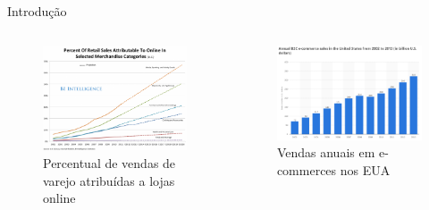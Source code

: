 \begin{frame}{Introdução}
\begin{columns}[c] %


\begin{figure}[ht]
    \begin{center}
    \includegraphics[width=1\textwidth]{img/crescimento-ecommerce}\caption{Percentual de vendas de varejo atribuídas a lojas online \cite{crescimento-ecommerce}}
    \end{center}
\end{figure}

\begin{figure}[ht]
    \begin{center}
    \includegraphics[width=1\textwidth]{img/sales-ecommerce}\caption{Vendas anuais em e-commerces nos EUA \cite{sales-ecommerce}}
    \end{center}
\end{figure}

\end{columns}

\end{frame}

